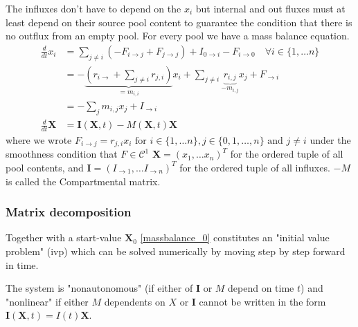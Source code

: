 \documentclass[journal abbreviation, manuscript]{copernicus}
\theoremstyle{definition}
\newcommand{\X}{\mathbf{X}}
\newcommand{\I}{\mathbf{I}}
\begin{document}
The influxes don't have to depend on the $x_i$  but internal and out fluxes must at least depend on their source pool content to guarantee the 
condition that there is no outflux from an empty pool. 
For every pool we have a mass balance equation.
\begin{align}
  \frac{d}{d t} x_i 
    &= 
    \sum_{j\ne i} (-F_{i\rightarrow j}+F_{j\rightarrow j}) + I_{0 \rightarrow i} - F_{i \rightarrow 0} \quad \forall i \in \{1,\dots n\}
    \\
    &= - \underbrace{
      \left(
      r_{i \rightarrow } 
      + 
      \sum_{j \ne i} r_{j,i}
      \right)
      }_{=m_{i,i}}
      x_i
      +
      \sum_{j \ne i} \underbrace{r_{i,j}}_{- m_{i,j}} x_j
      +
      F_{\rightarrow i}
    \\
    &= 
      -\sum_{j} m_{i,j} x_j + I_{\rightarrow i}
    \\
  \frac{d}{d t} \X &= \I(\X,t) - M(\X,t) \X \label{massbalance_0}
\end{align}
where we wrote $F_{i \rightarrow j} = r_{j,i} x_i \text{ for } i \in \{1, \dots n\} , j \in \{ 0, 1,\dots ,n\} \text{ and } j \ne i $ under the smoothness condition that $F \in \mathcal C^1$ \citep{Jacquez1972} 
$\X=(x_1,\dots x_n)^T$ for the ordered tuple of all pool contents, and $\I=(I_{\rightarrow 1},\dots I_{\rightarrow n})^T$ for the ordered tuple of all influxes.
$-M$ is called the Compartmental matrix.

\subsubsection{Matrix decomposition} 
Together with a start-value $\X_0$ \eqref{massbalance_0}  constitutes an "initial value problem" (ivp) which can be solved numerically by moving step by step forward in time.

%

The system is "nonautonomous" (if either of $\I$ or $M$ depend on time $t$) and "nonlinear" if either $M$ dependents on $X$ or $\I$ cannot be written in the form $\I(\X,t)=I(t)\X$.
\end{document}
